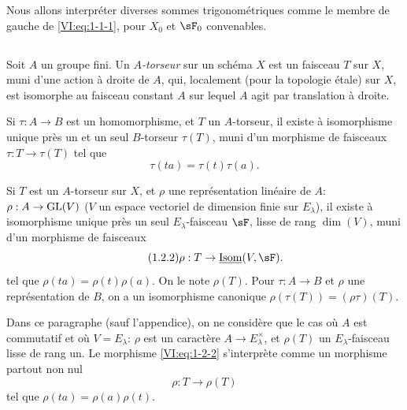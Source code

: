 Nous allons interpréter diverses sommes trigonométriques comme le membre de 
gauche de \eqref{VI:eq:1-1-1}, pour $X_0$ et $\sF_0$ convenables. 





\subsection{}\label{VI:1-2}

Soit $A$ un groupe fini. Un \emph{$A$-torseur} sur un schéma $X$ est un 
faisceau $T$ sur $X$, muni d'une action à droite de $A$, qui, localement 
(pour la topologie étale) sur $X$, est isomorphe au faisceau constant $A$ sur 
lequel $A$ agit par translation à droite. 

Si $\tau:A\to B$ est un homomorphisme, et $T$ un $A$-torseur, il existe à 
isomorphisme unique près un et un seul $B$-torseur $\tau(T)$, muni d'un 
morphisme de faisceaux $\tau:T\to \tau(T)$ tel que 
\begin{equation*}\tag{1.2.1}\label{VI:eq:1-2-1}
  \tau(t a) = \tau(t) \tau(a)\text{.}
\end{equation*}

Si $T$ est un $A$-torseur sur $X$, et $\rho$ une représentation linéaire 
de $A$: $\rho:A\to \operatorname{GL}(V)$ ($V$ un espace vectoriel de dimension finie sur 
$E_\lambda$), il existe à isomorphisme unique près un seul 
$E_\lambda$-faisceau $\sF$, lisse de rang $\dim(V)$, muni d'un morphisme de 
faisceaux 
\begin{equation*}\tag{1.2.2}\label{VI:eq:1-2-2}
  \rho:T\to \underline{\operatorname{Isom}}(V,\sF) \text{.}
\end{equation*}
tel que $\rho(t a) = \rho(t) \rho(a)$. On le note $\rho(T)$. Pour 
$\tau:A\to B$ et $\rho$ une représentation de $B$, on a un isomorphisme 
canonique $\rho(\tau(T)) = (\rho\tau)(T)$. 

Dans ce paragraphe (sauf l'appendice), on ne considère que le cas où $A$ 
est commutatif et où $V=E_\lambda$: $\rho$ est un caractère 
$A\to E_\lambda^\times$, et $\rho(T)$ un $E_\lambda$-faisceau lisse de rang 
un. Le morphisme \eqref{VI:eq:1-2-2} s'interprète comme un morphisme partout 
non nul 
\begin{equation*}\tag{1.2.3}\label{VI:eq:1-2-3}
  \rho:T\to \rho(T) 
\end{equation*}
tel que $\rho(t a) = \rho(a)\rho(t)$. 





